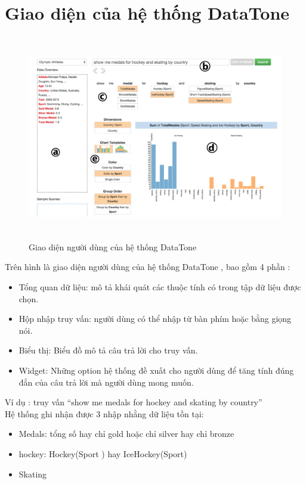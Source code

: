\documentclass[12pt]{report}
\begin{document}
\section{Giao diện của hệ thống DataTone}
\begin{figure}[h]
	\centering
	\includegraphics[width=20cm,
	height=9cm, keepaspectratio]{DataToneGUI.png}
	\caption{Giao diện người dùng của hệ thống DataTone}
\end{figure}
Trên hình là giao diện người dùng của hệ thống DataTone , bao gồm 4 phần :
\begin{itemize}
	\item Tổng quan dữ liệu: mô tả khái quát các thuộc tính có trong tập dữ liệu được chọn.
	\item Hộp nhập truy vấn: người dùng có thể nhập từ bàn phím hoặc bằng giọng nói.
	\item Biểu thị: Biểu đồ mô tả câu trả lời cho truy vấn.
	\item Widget: Những option hệ thống đề xuất cho người dùng để tăng tính đúng đắn của câu trả lời mà người dùng mong muốn.
\end{itemize}
Ví dụ : truy vấn “show me  medals for hockey and skating by country” \\
Hệ thống ghi nhận được 3 nhập nhằng dữ liệu tồn tại: 
\begin{itemize}
	\item Medals: tổng số hay chỉ gold hoặc chỉ silver hay chỉ bronze
	\item hockey:  Hockey(Sport ) hay IceHockey(Sport)
	\item Skating
\end{itemize}
\end{document}

